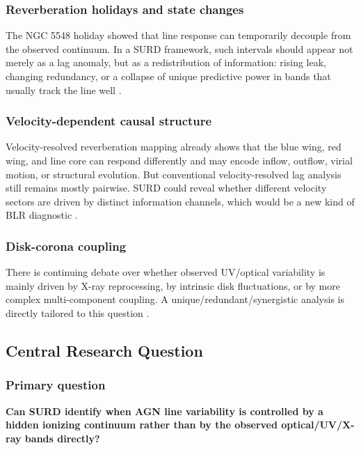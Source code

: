 \documentclass{article}
\begin{document}
\subsubsection{Reverberation holidays and state changes}

The NGC 5548 holiday showed that line response can temporarily decouple from the observed continuum. In a SURD framework, such intervals should appear not merely as a lag anomaly, but as a redistribution of information: rising leak, changing redundancy, or a collapse of unique predictive power in bands that usually track the line well \cite{Dehghanian2019}.

\subsubsection{Velocity-dependent causal structure}

Velocity-resolved reverberation mapping already shows that the blue wing, red wing, and line core can respond differently and may encode inflow, outflow, virial motion, or structural evolution. But conventional velocity-resolved lag analysis still remains mostly pairwise. SURD could reveal whether different velocity sectors are driven by distinct information channels, which would be a new kind of BLR diagnostic \cite{LuEtAl2022,FengEtAl2024,FengEtAl2021}.

\subsubsection{Disk-corona coupling}

There is continuing debate over whether observed UV/optical variability is mainly driven by X-ray reprocessing, by intrinsic disk fluctuations, or by more complex multi-component coupling. A unique/redundant/synergistic analysis is directly tailored to this question \cite{Korista2014,CackettHorneWinkler2021}.

\subsection{Central Research Question}

\subsubsection{Primary question}

\textbf{Can SURD identify when AGN line variability is controlled by a hidden ionizing continuum rather than by the observed optical/UV/X-ray bands directly?}
\end{document}
